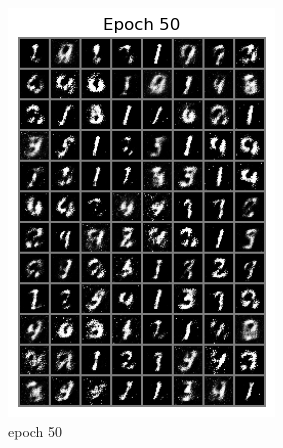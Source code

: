 \documentclass[a4paper]{article}
\theoremstyle{definition}
\newenvironment{soln}{
	\leavevmode\color{blue}\ignorespaces
}{}
\begin{document}
\begin{enumerate} [label=(\alph*)]
\begin{soln}
\begin{figure}[H]
\begin{subfigure}[b]{0.3\textwidth}
				\includegraphics[width=\textwidth]{1-Epoch50.png}
				\caption{epoch 50}
			\end{subfigure}
			\hfill
			\begin{subfigure}[b]{0.3\textwidth}
				\centering

\end{subfigure}
\end{figure}
\end{soln}
\end{enumerate}
\end{document}
